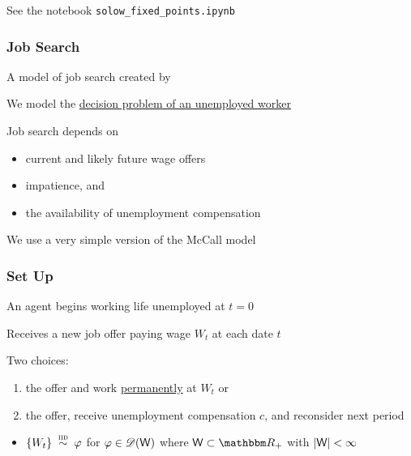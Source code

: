 \begin{frame}
    
    See the notebook \texttt{solow\_fixed\_points.ipynb}

\end{frame}



\begin{frame}
    \frametitle{Job Search}

    A model of job search created by 
    \vspace{0.5em}

    We model the \underline{decision problem of an unemployed worker}

    \vspace{0.5em}
    Job search depends on
    \begin{itemize}
        \item current and likely future wage offers
    \vspace{0.5em}
        \item impatience, and
    \vspace{0.5em}
        \item the availability of unemployment compensation
    \end{itemize}

    \vspace{0.5em}
    We use a very simple version of the McCall model 

\end{frame}


\begin{frame}
    \frametitle{Set Up}
    
    An agent begins working life unemployed at $t=0$ 

            \vspace{0.5em}
    Receives a new job offer paying wage $W_t$ at each date $t$  
            \vspace{0.5em}
            \vspace{0.5em}

    Two choices:
    \begin{enumerate}
        \item {} the offer and work \underline{permanently} at $W_t$ or
            \vspace{0.5em}
        \item {} the offer, receive unemployment compensation $c$, and reconsider next period
    \end{enumerate}

            \vspace{0.5em}
            \vspace{0.5em}
    \begin{itemize}
        \item $\{ W_t \} \stackrel{\textrm{ {\sc iid }}} {\sim} \varphi$ for $\varphi \in \mathscr D(\mathsf W)$ where $\Wsf
            \subset \RR_+$ with $|\mathsf W| < \infty$
    \end{itemize}


\end{frame}



